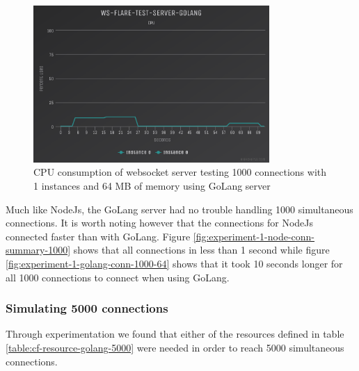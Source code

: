 \begin{figure}[H]
  \centering
    \includegraphics[width=0.8\textwidth]{figures/experiments/experiment-1/golang/cpu-1000-64.png}
    \caption{CPU consumption of websocket server testing 1000 connections with 1 instances and 64 MB of memory using GoLang server}
    \label{fig:experiment-1-golang-cpu-1000-64}
\end{figure}

Much like NodeJs, the GoLang server had no trouble handling 1000 simultaneous connections. It is worth noting however that the connections for NodeJs connected faster than with GoLang. Figure \ref{fig:experiment-1-node-conn-summary-1000} shows that all connections in less than 1 second while figure \ref{fig:experiment-1-golang-conn-1000-64} shows that it took 10 seconds longer for all 1000 connections to connect when using GoLang.

\subsubsection{Simulating 5000 connections}

Through experimentation we found that either of the resources defined in table \ref{table:cf-resource-golang-5000} were needed in order to reach 5000 simultaneous connections.

\begin{table}[H]
\caption{Cloud Foundry Resource Limits}
\label{table:cf-resource-golang-5000}
\end{table}

